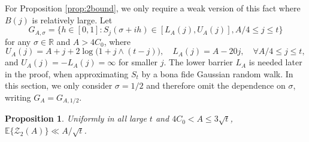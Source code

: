 \documentclass{amsart}
\newtheorem{proposition}[theorem]{Proposition}
\theoremstyle{definition}
\theoremstyle{remark}
\numberwithin{equation}{section}
\begin{document}
For Proposition \ref{prop:2bound}, we only require a weak version of this fact where $B(j)$ is relatively large. Let
\[
    G_{A,\sigma}=\{h\in [0,1]: S_j(\sigma+ih)\in [L_A(j),U_A(j)],  A/4\leq j\leq t \}
\]
for any $\sigma\in \mathbb{R}$ and $A>4C_0$, where 
 \begin{equation}\label{eq:upperlowerbarrier}
    U_A(j)=A+j+2\log\!\big(1+j\land (t-j)\big),\quad L_A(j)=A-20j,\quad \forall A/4\leq j\leq t,
\end{equation}
and $U_A(j)=-L_A(j)=\infty$ for smaller $j$. The lower barrier $L_A$ is needed later in the proof, when approximating $S_t$ by a bona fide Gaussian random walk. In this section, we only consider $\sigma=1/2$ and therefore omit the dependence on $\sigma$, writing $G_A=G_{A,1/2}$.
 \begin{proposition}\label{prop:boundZ(A)} Uniformly in all large $t$ and $4C_0<A\leq  3\sqrt{t}$, $\mathbb{E}\big\{\mathcal{Z}_2(A)\big\}\ll {A}/{\sqrt{t}}$.
\end{proposition}
\end{document}
